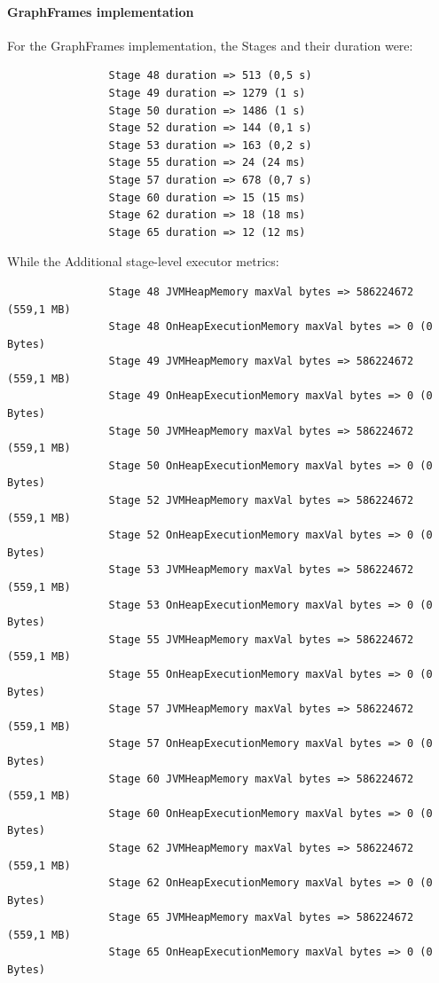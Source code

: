 \documentclass[a4paper,11pt, twoside]{article}
\begin{document}
            \paragraph{GraphFrames implementation}
            For the GraphFrames implementation, the Stages and their duration were:
            \begin{verbatim}
                Stage 48 duration => 513 (0,5 s)
                Stage 49 duration => 1279 (1 s)
                Stage 50 duration => 1486 (1 s)
                Stage 52 duration => 144 (0,1 s)
                Stage 53 duration => 163 (0,2 s)
                Stage 55 duration => 24 (24 ms)
                Stage 57 duration => 678 (0,7 s)
                Stage 60 duration => 15 (15 ms)
                Stage 62 duration => 18 (18 ms)
                Stage 65 duration => 12 (12 ms)
            \end{verbatim}
            \bigskip
            While the Additional stage-level executor metrics:
            \begin{verbatim}
                Stage 48 JVMHeapMemory maxVal bytes => 586224672 (559,1 MB)
                Stage 48 OnHeapExecutionMemory maxVal bytes => 0 (0 Bytes)
                Stage 49 JVMHeapMemory maxVal bytes => 586224672 (559,1 MB)
                Stage 49 OnHeapExecutionMemory maxVal bytes => 0 (0 Bytes)
                Stage 50 JVMHeapMemory maxVal bytes => 586224672 (559,1 MB)
                Stage 50 OnHeapExecutionMemory maxVal bytes => 0 (0 Bytes)
                Stage 52 JVMHeapMemory maxVal bytes => 586224672 (559,1 MB)
                Stage 52 OnHeapExecutionMemory maxVal bytes => 0 (0 Bytes)
                Stage 53 JVMHeapMemory maxVal bytes => 586224672 (559,1 MB)
                Stage 53 OnHeapExecutionMemory maxVal bytes => 0 (0 Bytes)
                Stage 55 JVMHeapMemory maxVal bytes => 586224672 (559,1 MB)
                Stage 55 OnHeapExecutionMemory maxVal bytes => 0 (0 Bytes)
                Stage 57 JVMHeapMemory maxVal bytes => 586224672 (559,1 MB)
                Stage 57 OnHeapExecutionMemory maxVal bytes => 0 (0 Bytes)
                Stage 60 JVMHeapMemory maxVal bytes => 586224672 (559,1 MB)
                Stage 60 OnHeapExecutionMemory maxVal bytes => 0 (0 Bytes)
                Stage 62 JVMHeapMemory maxVal bytes => 586224672 (559,1 MB)
                Stage 62 OnHeapExecutionMemory maxVal bytes => 0 (0 Bytes)
                Stage 65 JVMHeapMemory maxVal bytes => 586224672 (559,1 MB)
                Stage 65 OnHeapExecutionMemory maxVal bytes => 0 (0 Bytes)
            \end{verbatim}
    	\clearpage
    
\end{document}
